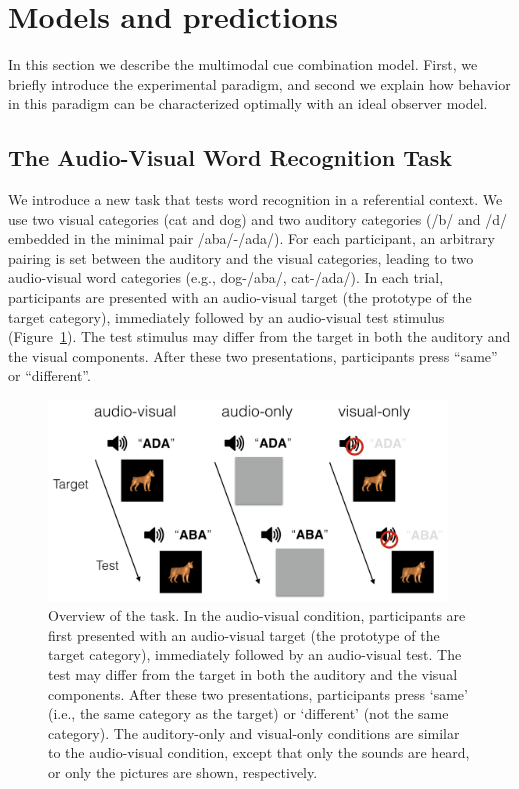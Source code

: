\documentclass[english,man]{apa6}
\theoremstyle{definition}
\theoremstyle{definition}
\theoremstyle{definition}
\theoremstyle{remark}
\begin{document}
\section{Models and predictions}\label{models-and-predictions}

In this section we describe the multimodal cue combination model. First,
we briefly introduce the experimental paradigm, and second we explain
how behavior in this paradigm can be characterized optimally with an
ideal observer model.

\subsection{The Audio-Visual Word Recognition
Task}\label{the-audio-visual-word-recognition-task}

We introduce a new task that tests word recognition in a referential
context. We use two visual categories (cat and dog) and two auditory
categories (/b/ and /d/ embedded in the minimal pair /aba/-/ada/). For
each participant, an arbitrary pairing is set between the auditory and
the visual categories, leading to two audio-visual word categories
(e.g., dog-/aba/, cat-/ada/). In each trial, participants are presented
with an audio-visual target (the prototype of the target category),
immediately followed by an audio-visual test stimulus
(Figure~\ref{fig:task}). The test stimulus may differ from the target in
both the auditory and the visual components. After these two
presentations, participants press \enquote{same} or \enquote{different}.

\begin{figure}

{\centering \includegraphics[width=400px]{pictures/task} 

}

\caption{Overview of the task. In the audio-visual condition, participants are first presented with an audio-visual target (the prototype of the target category), immediately followed by an audio-visual test. The test may differ from the target in both the auditory and the visual components. After these two presentations, participants press `same' (i.e., the same category as the target) or `different' (not the same category). The auditory-only and visual-only conditions are similar to the audio-visual condition, except that only the sounds are heard, or only the pictures are shown, respectively.}\label{fig:task}
\end{figure}
\end{document}
